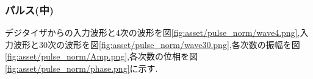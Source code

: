 \subsubsection{パルス(中)}
デジタイザからの入力波形と4次の波形を図\ref{fig:asset/pulse_norm/wave4.png},入力波形と30次の波形を図\ref{fig:asset/pulse_norm/wave30.png},各次数の振幅を図\ref{fig:asset/pulse_norm/Amp.png},各次数の位相を図\ref{fig:asset/pulse_norm/phase.png}に示す.
\begin{figure}[htbp]
  \begin{minipage}{0.5\hsize}
  \end{minipage}
  \begin{minipage}{0.5\hsize}
  \end{minipage} 
\end{figure}
\begin{figure}[htbp]
  \begin{minipage}{0.5\hsize}
  \end{minipage}
  \begin{minipage}{0.5\hsize}
  \end{minipage} 
\end{figure}